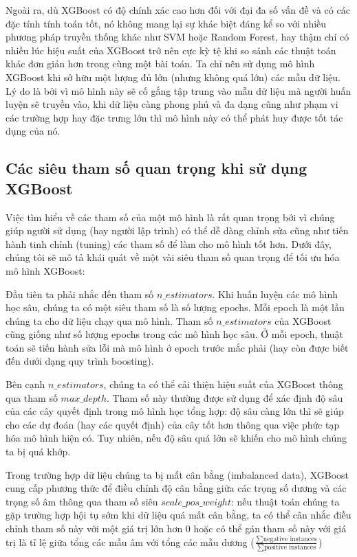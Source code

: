 \documentclass{article}
\begin{document}
Ngoài ra, dù XGBoost có độ chính xác cao hơn đối với đại đa số vấn đề và có các đặc tính tính toán tốt, nó không mang lại sự khác biệt đáng kể so với nhiều phương pháp truyền thống khác như SVM hoặc Random Forest, hay thậm chí có nhiều lúc hiệu suất của XGBoost trở nên cực kỳ tệ khi so sánh các thuật toán khác đơn giản hơn trong cùng một bài toán. Ta chỉ nên sử dụng mô hình XGBoost khi sở hữu một lượng đủ lớn (nhưng không quá lớn) các mẫu dữ liệu. Lý do là bởi vì mô hình này sẽ cố gắng tập trung vào mẫu dữ liệu mà người huấn luyện sẽ truyền vào, khi dữ liệu càng phong phú và đa dạng cũng như phạm vi các trường hợp hay đặc trưng lớn thì mô hình này có thể phát huy được tốt tác dụng của nó.
 
\subsection{Các siêu tham số quan trọng khi sử dụng XGBoost} 

Việc tìm hiểu về các tham số của một mô hình là rất quan trọng bởi vì chúng giúp người sử dụng (hay người lập trình) có thể dễ dàng chỉnh sửa cũng như tiến hành tinh chỉnh (tuning) các tham số để làm cho mô hình tốt hơn. Dưới đây, chúng tôi sẽ mô tả khái quát về một vài siêu tham số quan trọng để tối ưu hóa mô hình XGBoost:
 
Đầu tiên ta phải nhắc đến tham số \textbf{$n\_estimators$}. Khi huấn luyện các mô hình học sâu, chúng ta có một siêu tham số là số lượng epochs. Mỗi epoch là một lần chúng ta cho dữ liệu chạy qua mô hình. Tham số $n\_estimators$ của XGBoost cũng giống như số lượng epochs trong các mô hình học sâu. Ở mỗi epoch, thuật toán sẽ tiến hành sửa lỗi mà mô hình ở epoch trước mắc phải (hay còn được biết đến dưới dạng quy trình boosting).

Bên cạnh $n\_estimators$, chúng ta có thể cải thiện hiệu suất của XGBoost thông qua tham số $max\_depth$. Tham số này thường được sử dụng để xác định độ sâu của các cây quyết định trong mô hình học tổng hợp: độ sâu càng lớn thì sẽ giúp cho các dự đoán (hay các quyết định) của cây tốt hơn thông qua việc phức tạp hóa mô hình hiện có. Tuy nhiên, nếu độ sâu quá lớn sẽ khiến cho mô hình chúng ta bị quá khớp. 

Trong trường hợp dữ liệu chúng ta bị mất cân bằng (imbalanced data), XGBoost cung cấp phương thức để điều chỉnh độ cân bằng giữa các trọng số dương và các trọng số âm thông qua tham số siêu $scale\_pos\_weight$: nếu thuật toán chúng ta gặp trường hợp hội tụ sớm khi dữ liệu quá mất cân bằng, ta có thể cân nhắc điều chỉnh tham số này với một giá trị lớn hơn 0  hoặc có thể gán tham số này với giá trị là tỉ lệ giữa tổng các mẫu âm với tổng các mẫu dương ($\frac{\sum{\text{negative instances}}}{\sum{\text{positive instances}}}$)
\end{document}
